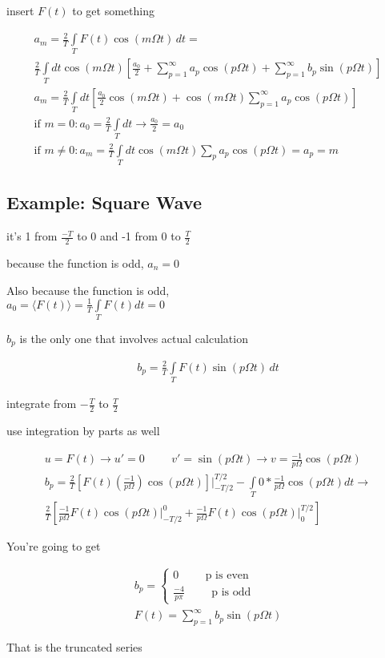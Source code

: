 \documentclass[fleqn]{report}
\newcommand{\hp}{\hspace{1cm}}
\newcommand{\equations} [1] {
\begin{gather*}
#1
\end{gather*}
}
\begin{document}
insert $F(t)$ to get something 

\equations{
    a_m = \frac{2}{T} \int \limits_T F(t) \cos(m \Omega t) \, dt 
    = 
    \\
    \frac{2}{T} \int \limits_T dt \cos(m \Omega t) 
    \left[
        \frac{a_0}{2} + 
        \sum^\infty_{p = 1} a_p \cos(p \Omega t)
        + \sum^\infty_{p = 1} b_p \sin(p \Omega t)
    \right]
    \\
    a_m = \frac{2}{T} \int \limits_T dt \left[
        \frac{a_0}{2} \cos(m \Omega t)
        + 
        \cos(m \Omega t) \sum^\infty_{p = 1} a_p \cos(p \Omega t)
    \right]
    \\
    \textrm{if } m = 0: a_0 = \frac{2}{T} \int \limits_T dt 
    \rightarrow \frac{a_0}{2} = a_0
    \\
    \textrm{if } m \neq 0 : a_m = \frac{2}{T} \int \limits_T
    dt \cos(m \Omega t) \sum_p  a_p \cos(p \Omega t) = a_p = m
}

\subsection{Example: Square Wave}
it's 1 from $\frac{-T}{2}$ to 0 and -1 from 0 to $\frac{T}{2}$
 
because the function is odd, $a_n = 0$

Also because the function is odd, \\
$a_0 = \langle F(t) \rangle = 
\frac{1}{T} \int \limits_T F(t) dt = 0$

$b_p$ is the only one that involves actual calculation 

\equations{
    b_p = \frac{2}{T} \int \limits_T F(t) \sin(p \Omega t) \, dt 
}
integrate from $-\frac{T}{2}$ to $\frac{T}{2}$ 

use integration by parts as well 

\equations{
    u = F(t) \rightarrow u' = 0 
    \hp 
    v' = \sin(p \Omega t) \rightarrow v = 
    \frac{-1}{p \Omega} \cos(p \Omega t) 
    \\
    b_p = 
    \frac{2}{T}
    \left[
        F(t) (\frac{-1}{p \Omega}) \cos(p \Omega t)
    \right]
    \Big|^{T/2}_{-T/2} - 
    \int \limits_T 0 * \frac{-1}{p \Omega} \cos(p \Omega t) dt 
    \rightarrow \\
    \frac{2}{T} 
    \left[
        \frac{-1}{p \Omega} F(t) \cos(p \Omega t) \Big|^0_{-T/2} + 
        \frac{-1}{p \Omega} F(t) \cos(p \Omega t) \Big|^{T/2}_{0}
    \right]
}

You're going to get 
\equations{
    b_p = 
    \begin{cases}
        0 \hp \textrm{p is even} \\
        \frac{-4}{p \pi} \hp \textrm{p is odd}
    \end{cases}
    \\
    F(t) = \sum^\infty_{p = 1} b_p \sin(p \Omega t)
}
That is the truncated series 
\end{document}
